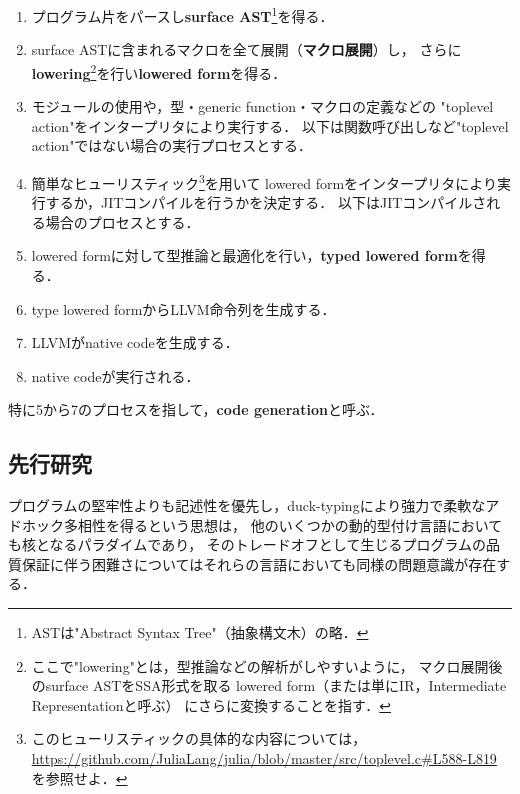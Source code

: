 \begin{enumerate}
  \item プログラム片をパースし\textbf{surface AST}\footnote{
          ASTは"Abstract Syntax Tree"（抽象構文木）の略．
        }を得る．
  \item surface ASTに含まれるマクロを全て展開（\textbf{マクロ展開}）し，
        さらに\textbf{lowering}\footnote{
          ここで"lowering"とは，型推論などの解析がしやすいように，
          マクロ展開後のsurface ASTをSSA形式\cite{julia-ssa}を取る
          lowered form（または単にIR，Intermediate Representationと呼ぶ）
          にさらに変換することを指す．
        }を行い\textbf{lowered form}を得る．
  \item モジュールの使用や，型・generic function・マクロの定義などの
        "toplevel action"をインタープリタにより実行する．
        以下は関数呼び出しなど"toplevel action"ではない場合の実行プロセスとする．
  \item 簡単なヒューリスティック\footnote{
          このヒューリスティックの具体的な内容については，
          \url{https://github.com/JuliaLang/julia/blob/master/src/toplevel.c\#L588-L819}
          を参照せよ．
        }を用いて
        lowered formをインタープリタにより実行するか，JITコンパイルを行うかを決定する．
        以下はJITコンパイルされる場合のプロセスとする．
  \item lowered formに対して型推論と最適化を行い，\textbf{typed lowered form}を得る．
  \item type lowered formからLLVM命令列を生成する．
  \item LLVMがnative codeを生成する．
  \item native codeが実行される．
\end{enumerate}

特に5から7のプロセスを指して，\textbf{code generation}と呼ぶ．

\subsection{先行研究} \label{subsection:prev-reseaches}


プログラムの堅牢性よりも記述性を優先し，duck-typingにより強力で柔軟なアドホック多相性を得るという思想は，
他のいくつかの動的型付け言語においても核となるパラダイムであり，
そのトレードオフとして生じるプログラムの品質保証に伴う困難さについてはそれらの言語においても同様の問題意識が存在する．

